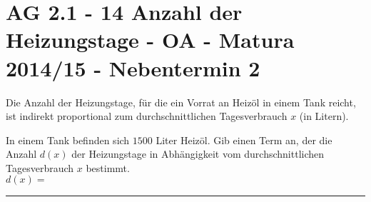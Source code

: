 \section{AG 2.1 - 14 Anzahl der Heizungstage - OA - Matura 2014/15 - Nebentermin 2}

\begin{beispiel}[AG 2.1]{1} %
				Die Anzahl der Heizungstage, für die ein Vorrat an Heizöl in einem Tank reicht, ist indirekt proportional zum durchschnittlichen Tagesverbrauch $x$ (in Litern).
				
				In einem Tank befinden sich $1500$ Liter Heizöl. Gib einen Term an, der die Anzahl $d(x)$ der Heizungstage in Abhängigkeit vom durchschnittlichen Tagesverbrauch $x$ bestimmt.\\
				
				$d(x)=$ \rule{5cm}{0.3pt}\\
				
\end{beispiel}